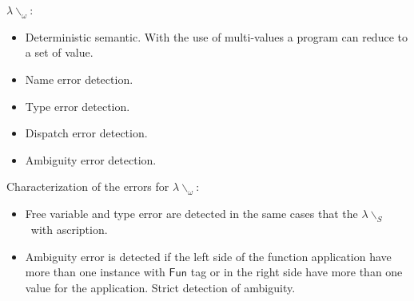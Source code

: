 \documentclass[preprint,authoryear,sort&compress,9pt,nocopyrightspace]{article}
\newcommand{\funt}{\mathsf{Fun}}
\newcommand{\semanticB}{${\lambda}{\backslash}_S$}
\newcommand{\semanticC}{${\lambda}{\backslash}_\omega$}
\begin{document}
\semanticC:
\begin{itemize}\item Deterministic semantic. With the use of multi-values a program can reduce to a set of value.
\item Name error detection.
\item Type error detection.
\item Dispatch error detection.
\item Ambiguity error detection.
\end{itemize}
Characterization of the errors for \semanticC:
\begin{itemize}
\item Free variable and type error are detected in the same cases that the \semanticB \ with ascription.
\item Ambiguity error is detected if the left side of the function application  have more than one instance with $\funt$ tag or in the right side have more than one value for the application. Strict detection of ambiguity. 
\end{itemize}
\end{document}
